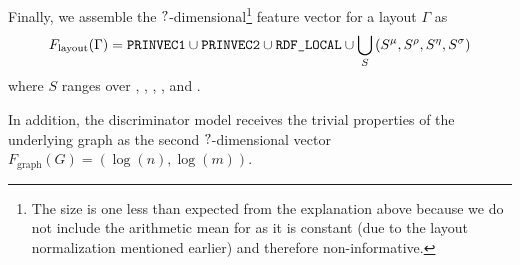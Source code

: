 Finally, we assemble the \ensuremath{\NNSharedInputDims}-dimensional\footnote{%
  The size is one less than expected from the explanation above because we do not include the arithmetic mean for
   as it is constant (due to the layout normalization mentioned earlier) and therefore
  non-informative.
} feature vector for a layout $\Gamma$ as
\begin{equation*}
  F_\mathrm{layout}(\Gamma) =
  \mbox{\text{\upshape\ttfamily PRINVEC1}}\cup\mbox{\text{\upshape\ttfamily PRINVEC2}}\cup\mbox{\text{\upshape\ttfamily RDF\_LOCAL}}
  \cup\bigcup_{S}\left(S^\mu,S^\rho,S^\eta,S^\sigma\right)
\end{equation*}
where $S$ ranges over , , , ,  and
.

In addition, the discriminator model receives the trivial properties of the underlying graph as the second
\ensuremath{\NNTotalAuxHiddenDims}-dimensional vector $F_\mathrm{graph}(G)=(\log(n),\log(m))$.
